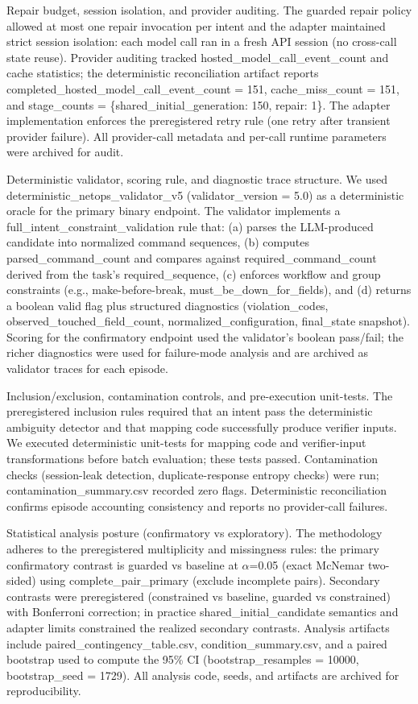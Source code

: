 \documentclass[conference]{IEEEtran}
\begin{document}
Repair budget, session isolation, and provider auditing. The guarded repair policy allowed at most one repair invocation per intent and the adapter maintained strict session isolation: each model call ran in a fresh API session (no cross-call state reuse). Provider auditing tracked hosted\_model\_call\_event\_count and cache statistics; the deterministic reconciliation artifact reports completed\_hosted\_model\_call\_event\_count = 151, cache\_miss\_count = 151, and stage\_counts = \{shared\_initial\_generation: 150, repair: 1\}. The adapter implementation enforces the preregistered retry rule (one retry after transient provider failure). All provider-call metadata and per-call runtime parameters were archived for audit.

Deterministic validator, scoring rule, and diagnostic trace structure. We used deterministic\_netops\_validator\_v5 (validator\_version = 5.0) as a deterministic oracle for the primary binary endpoint. The validator implements a full\_intent\_constraint\_validation rule that: (a) parses the LLM-produced candidate into normalized command sequences, (b) computes parsed\_command\_count and compares against required\_command\_count derived from the task's required\_sequence, (c) enforces workflow and group constraints (e.g., make-before-break, must\_be\_down\_for\_fields), and (d) returns a boolean valid flag plus structured diagnostics (violation\_codes, observed\_touched\_field\_count, normalized\_configuration, final\_state snapshot). Scoring for the confirmatory endpoint used the validator's boolean pass/fail; the richer diagnostics were used for failure-mode analysis and are archived as validator traces for each episode.

Inclusion/exclusion, contamination controls, and pre-execution unit-tests. The preregistered inclusion rules required that an intent pass the deterministic ambiguity detector and that mapping code successfully produce verifier inputs. We executed deterministic unit-tests for mapping code and verifier-input transformations before batch evaluation; these tests passed. Contamination checks (session-leak detection, duplicate-response entropy checks) were run; contamination\_summary.csv recorded zero flags. Deterministic reconciliation confirms episode accounting consistency and reports no provider-call failures.

Statistical analysis posture (confirmatory vs exploratory). The methodology adheres to the preregistered multiplicity and missingness rules: the primary confirmatory contrast is guarded vs baseline at \ensuremath{\alpha}=0.05 (exact McNemar two-sided) using complete\_pair\_primary (exclude incomplete pairs). Secondary contrasts were preregistered (constrained vs baseline, guarded vs constrained) with Bonferroni correction; in practice shared\_initial\_candidate semantics and adapter limits constrained the realized secondary contrasts. Analysis artifacts include paired\_contingency\_table.csv, condition\_summary.csv, and a paired bootstrap used to compute the 95\% CI (bootstrap\_resamples = 10000, bootstrap\_seed = 1729). All analysis code, seeds, and artifacts are archived for reproducibility.
\end{document}
